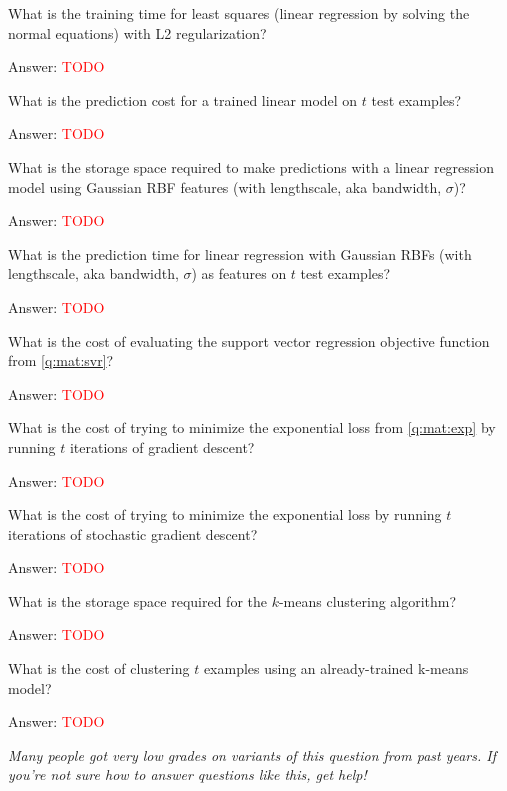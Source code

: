 \documentclass{article}
\newenvironment{answer}{\par\begingroup\color{answer}Answer: }{\endgroup}
\newcommand{\red}[1]{\textcolor{red}{#1}}
\newcommand{\meta}[1]{\textcolor{black!60!white}{\emph{#1}}}
\newcommand{\TODO}{\red{TODO}}
\begin{document}
\begin{qlist}\color{question}
\item What is the training time for least squares (linear regression by solving the normal equations) with L2 regularization?
\begin{answer}\TODO\end{answer}

\item What is the prediction cost for a trained linear model on $t$ test examples?
\begin{answer}\TODO\end{answer}

\item What is the storage space required to make predictions with a linear regression model using Gaussian RBF features (with lengthscale, aka bandwidth, $\sigma$)?
\begin{answer}\TODO\end{answer}

\item What is the prediction time for linear regression with Gaussian RBFs (with lengthscale, aka bandwidth, $\sigma$) as features on $t$ test examples?
\begin{answer}\TODO\end{answer}

\item What is the cost of evaluating the support vector regression objective function from \cref{q:mat:svr}?
\begin{answer}\TODO\end{answer}

\item What is the cost of trying to minimize the exponential loss from \cref{q:mat:exp} by running $t$ iterations of gradient descent?
\begin{answer}\TODO\end{answer}

\item What is the cost of trying to minimize the exponential loss by running $t$ iterations of stochastic gradient descent?
\begin{answer}\TODO\end{answer}

\item What is the storage space required for the $k$-means clustering algorithm?
\begin{answer}\TODO\end{answer}

\item What is the cost of clustering $t$ examples using an already-trained k-means model?
\begin{answer}\TODO\end{answer}

\end{qlist}
\meta{Many people got very low grades on variants of this question from past years. If you're not sure how to answer questions like this, get help!}
\end{document}
